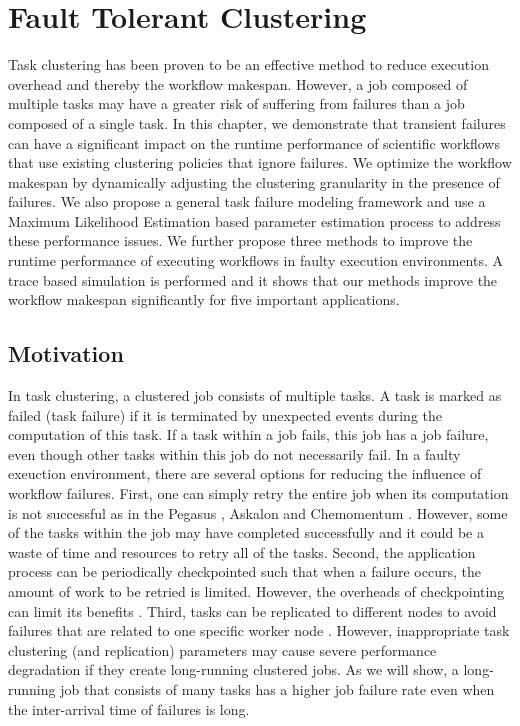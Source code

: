 \chapter{Fault Tolerant Clustering}
\label{chap:tolerance}

Task clustering has been proven to be an effective method to reduce execution overhead and thereby the workflow makespan. However, a job composed of multiple tasks may have a greater risk of suffering from failures than a job composed of a single task. In this chapter, we demonstrate that transient failures can have a significant impact on the runtime performance of scientific workflows that use existing clustering policies that ignore failures. We optimize the workflow makespan by dynamically adjusting the clustering granularity in the presence of failures. We also propose a general task failure modeling framework and use a Maximum Likelihood Estimation based parameter estimation process to address these performance issues. We further propose three methods to improve the runtime performance of executing workflows in faulty execution environments. A trace based simulation is performed and it shows that our methods improve the workflow makespan significantly for five important applications.    

\section{Motivation}


In task clustering, a clustered job consists of multiple tasks. A task is marked as failed (task failure) if it is terminated by unexpected events during the computation of this task. If a task within a job fails, this job has a job failure, even though other tasks within this job do not necessarily fail. 
In a faulty exeuction environment, there are several options for reducing the influence of workflow failures. First, one can simply retry the entire job when its computation is not successful as in the Pegasus \cite{Deelman2004}, Askalon \cite{fahringer2007askalon} and Chemomentum \cite{schuller2008chemomentum}. However, some of the tasks within the job may have completed successfully and it could be a waste of time and resources to retry all of the tasks. Second, the application process can be periodically checkpointed such that when a failure occurs, the amount of work to be retried is limited. However, the overheads of checkpointing can limit its benefits \cite{Zhang2004}. Third, tasks can be replicated to different nodes to avoid failures that are related to one specific worker node \cite{Plankensteiner2009}. However, inappropriate task clustering (and replication) parameters may cause severe performance degradation if they create long-running clustered jobs. As we will show, a long-running job that consists of many tasks has a higher job failure rate even when the inter-arrival time of failures is long. 

